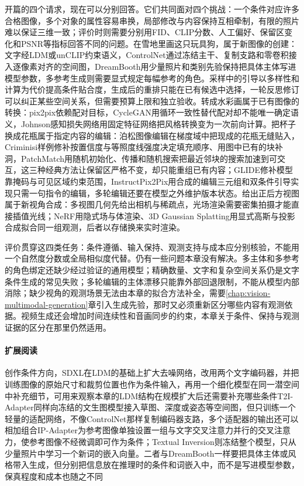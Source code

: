 开篇的四个请求，现在可以分别回答。它们共同面对四个挑战：一个条件对应许多合格图像，多个对象的属性容易串换，局部修改与内容保持互相牵制，有限的照片难以保证三维一致；评价时则需要分别用FID、CLIP分数、人工偏好、保留区变化和PSNR等指标回答不同的问题。在雪地里画这只玩具狗，属于新图像的创建：文字经LDM或unCLIP约束语义，ControlNet通过冻结主干、复制支路和零卷积接入逐像素对齐的空间图，DreamBooth用少量照片和类别先验保持把具体主体写进模型参数，多参考生成则需要显式规定每幅参考的角色。采样中的引导以多样性和计算为代价提高条件贴合度，生成后的重排只能在已有候选中选择，一轮反思修订可以纠正某些空间关系，但需要预算上限和独立验收。转成水彩画属于已有图像的转换：pix2pix依赖配对目标，CycleGAN用循环一致性替代配对却不能唯一确定语义，Johnson感知损失网络用固定特征网络把风格转换变为一次前向计算。把杯子换成花瓶属于指定内容的编辑：泊松图像编辑在梯度域中把现成的花瓶无缝贴入，Criminisi样例修补按置信度与等照度线强度决定填充顺序、用图中已有的块补洞，PatchMatch用随机初始化、传播和随机搜索把最近邻块的搜索加速到可交互，这三种经典方法让保留区严格不变，却只能重组已有内容；GLIDE修补模型靠掩码与可见区域约束范围，InstructPix2Pix用合成的编辑三元组和双条件引导实现只需一句指令的编辑，多轮编辑还要在模型之外维护版本状态。给出正后方视图属于新视角合成：多视图几何先给出相机与稀疏点，光场渲染需要密集拍摄才能直接插值光线；NeRF用隐式场与体渲染、3D Gaussian Splatting用显式高斯与投影合成拟合同一组观测，后者以存储换来实时渲染。

评价贯穿这四类任务：条件遵循、输入保持、观测支持与成本应分别核验，不能用一个自然度分数或全局相似度代替。仍有一些问题本章没有解决。多主体和多参考的角色绑定还缺少经过验证的通用模型；精确数量、文字和复杂空间关系仍是文字条件生成的常见失败；多轮编辑的主体漂移只能靠外部回退限制，不能从模型内部消除；缺少视角的观测场景无法由本章的拟合方法补全，需要\ref{chap:vision-multimodal-generation}章引入生成先验，那时又必须重新区分哪些内容有观测依据。视频生成还会增加时间连续性和音画同步的约束，本章关于条件、保持与观测证据的区分在那里仍然适用。

\paragraph{扩展阅读}
创作条件方向，SDXL在LDM的基础上扩大去噪网络，改用两个文字编码器，并把训练图像的原始尺寸和裁剪位置也作为条件输入，再用一个细化模型在同一潜空间中补充细节，可用来观察本章的LDM结构在规模扩大后还需要补充哪些条件T2I-Adapter同样向冻结的文生图模型接入草图、深度或姿态等空间图，但只训练一个轻量的适配网络，不像ControlNet那样复制编码器支路，多个适配器的输出还可以相加组合IP-Adapter为参考图像单独设置一组与文字交叉注意力并行的交叉注意力，使参考图像不经微调即可作为条件；Textual Inversion则冻结整个模型，只从少量照片中学习一个新词的嵌入向量。二者与DreamBooth一样要把具体主体或风格带入生成，但分别把信息放在推理时的条件和词嵌入中，而不是写进模型参数，保真程度和成本也随之不同

